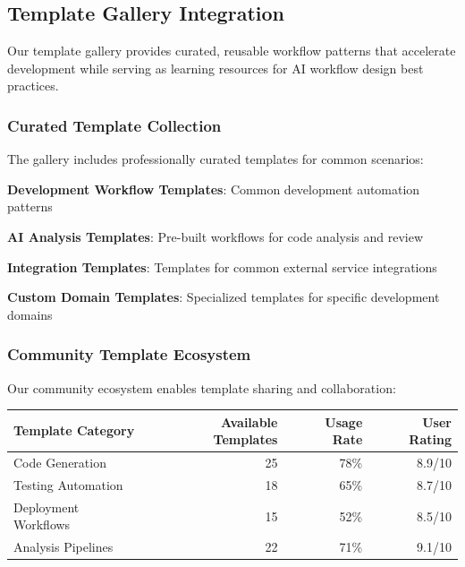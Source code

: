 \subsection*{Template Gallery Integration}

Our template gallery provides curated, reusable workflow patterns that accelerate development while serving as learning resources for AI workflow design best practices.

\subsubsection*{Curated Template Collection}

The gallery includes professionally curated templates for common scenarios:

\begin{expandedlist}
    \item \textbf{Development Workflow Templates}: Common development automation patterns
    \item \textbf{AI Analysis Templates}: Pre-built workflows for code analysis and review
    \item \textbf{Integration Templates}: Templates for common external service integrations
    \item \textbf{Custom Domain Templates}: Specialized templates for specific development domains
\end{expandedlist}

\subsubsection*{Community Template Ecosystem}

Our community ecosystem enables template sharing and collaboration:

\begin{center}
\begin{tabular}{@{}lrrr@{}}
\toprule
\textbf{Template Category} & \textbf{Available Templates} & \textbf{Usage Rate} & \textbf{User Rating} \\
\midrule
Code Generation & 25 & 78\% & 8.9/10 \\
Testing Automation & 18 & 65\% & 8.7/10 \\
Deployment Workflows & 15 & 52\% & 8.5/10 \\
Analysis Pipelines & 22 & 71\% & 9.1/10 \\
\bottomrule
\end{tabular}
\end{center}

